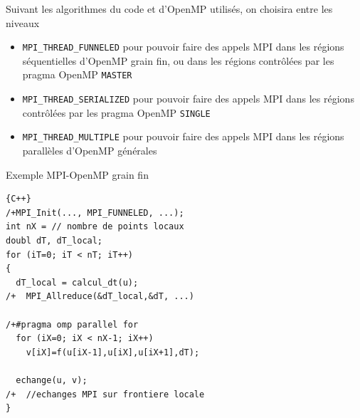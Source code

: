 \documentclass{beamer}
\begin{document}
\begin{frame}
	
	Suivant les algorithmes du code et d'OpenMP utilisés, on choisira entre les niveaux 
\vfill
	
	\begin{itemize}
		\item \texttt{MPI\_THREAD\_FUNNELED} pour pouvoir faire des appels MPI dans les régions séquentielles d'OpenMP grain fin, ou dans les régions contrôlées par les pragma OpenMP \texttt{MASTER}
		
\vfill
		\item \texttt{MPI\_THREAD\_SERIALIZED} pour pouvoir faire des appels MPI dans les régions contrôlées par les pragma OpenMP \texttt{SINGLE}
		
\vfill
		\item \texttt{MPI\_THREAD\_MULTIPLE} pour pouvoir faire des appels MPI dans les régions parallèles d'OpenMP générales
	\end{itemize}
\vfill

\end{frame}

\begin{frame}[fragile]
	Exemple MPI-OpenMP grain fin
	

\begin{lstlisting}{C++}
/+MPI_Init(..., MPI_FUNNELED, ...);
int nX = // nombre de points locaux	
doubl dT, dT_local;
for (iT=0; iT < nT; iT++)
{
  dT_local = calcul_dt(u);
/+  MPI_Allreduce(&dT_local,&dT, ...)
  
/+#pragma omp parallel for
  for (iX=0; iX < nX-1; iX++)
    v[iX]=f(u[iX-1],u[iX],u[iX+1],dT);
    
  echange(u, v);
/+  //echanges MPI sur frontiere locale  
}
	\end{lstlisting}
	
\end{frame}
\end{document}
